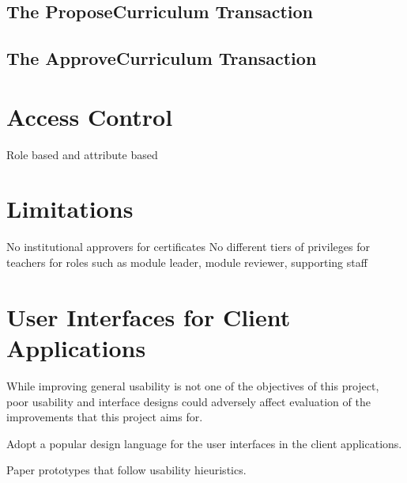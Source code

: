 \subsection{The ProposeCurriculum Transaction}

\subsection{The ApproveCurriculum Transaction}


\section{Access Control}
Role based and attribute based

\section{Limitations}
No institutional approvers for certificates
No different tiers of privileges for teachers for roles such as module leader, module reviewer, supporting staff

\section{User Interfaces for Client Applications}

While improving general usability is not one of the objectives of this project, poor usability and interface designs 
could adversely affect evaluation of the improvements that this project aims for.

Adopt a popular design language for the user interfaces in the client applications.

Paper prototypes that follow usability hieuristics.